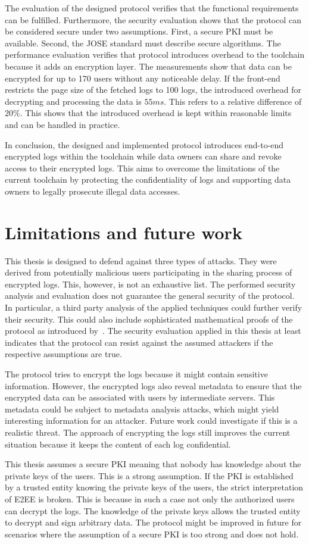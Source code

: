 \documentclass[../main.tex]{subfiles}
\begin{document}
The evaluation of the designed protocol verifies that the functional requirements can be fulfilled.
Furthermore, the security evaluation shows that the protocol can be considered secure under two assumptions.
First, a secure PKI must be available.
Second, the JOSE standard must describe secure algorithms.
The performance evaluation verifies that protocol introduces overhead to the toolchain because it adds an encryption layer.
The measurements show that data can be encrypted for up to 170 users without any noticeable delay.
If the front-end restricts the page size of the fetched logs to 100 logs, the introduced overhead for decrypting and processing the data is $55ms$.
This refers to a relative difference of $20\%$.
This shows that the introduced overhead is kept within reasonable limits and can be handled in practice.

In conclusion, the designed and implemented protocol introduces end-to-end encrypted logs within the toolchain while data owners can share and revoke access to their encrypted logs.
This aims to overcome the limitations of the current toolchain by protecting the confidentiality of logs and supporting data owners to legally prosecute illegal data accesses.


\section{Limitations and future work}
\label{sec:limitations}
This thesis is designed to defend against three types of attacks.
They were derived from potentially malicious users participating in the sharing process of encrypted logs.
This, however, is not an exhaustive list.
The performed security analysis and evaluation does not guarantee the general security of the protocol.
In particular, a third party analysis of the applied techniques could further verify their security.
This could also include sophisticated mathematical proofs of the protocol as introduced by~\cite{Katz2020}.   
The security evaluation applied in this thesis at least indicates that the protocol can resist against the assumed attackers if the respective assumptions are true.

The protocol tries to encrypt the logs because it might contain sensitive information.
However, the encrypted logs also reveal metadata to ensure that the encrypted data can be associated with users by intermediate servers.
This metadata could be subject to metadata analysis attacks, which might yield interesting information for an attacker.
Future work could investigate if this is a realistic threat.
The approach of encrypting the logs still improves the current situation because it keeps the content of each log confidential.

This thesis assumes a secure PKI meaning that nobody has knowledge about the private keys of the users.
This is a strong assumption.
If the PKI is established by a trusted entity knowing the private keys of the users, the strict interpretation of E2EE is broken.
This is because in such a case not only the authorized users can decrypt the logs.
The knowledge of the private keys allows the trusted entity to decrypt and sign arbitrary data.
The protocol might be improved in future for scenarios where the assumption of a secure PKI is too strong and does not hold.
\end{document}
